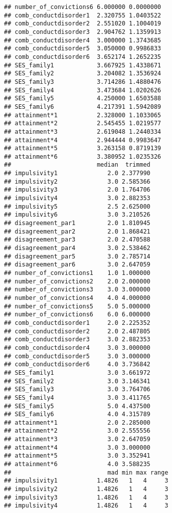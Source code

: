 \documentclass[]{tufte-handout}
\begin{document}
\begin{verbatim}
## number_of_convictions6 6.000000 0.0000000
## comb_conductdisorder1  2.320755 1.0403522
## comb_conductdisorder2  2.551020 1.1004019
## comb_conductdisorder3  2.904762 1.1359913
## comb_conductdisorder4  3.000000 1.3743685
## comb_conductdisorder5  3.050000 0.9986833
## comb_conductdisorder6  3.652174 1.2652235
## SES_family1            3.667925 1.4338671
## SES_family2            3.204082 1.3536924
## SES_family3            3.714286 1.4880476
## SES_family4            3.473684 1.0202626
## SES_family5            4.250000 1.6503588
## SES_family6            4.217391 1.5942089
## attainment*1           2.328000 1.1033065
## attainment*2           2.545455 1.0219577
## attainment*3           2.619048 1.2440334
## attainment*4           2.944444 0.9983647
## attainment*5           3.263158 0.8719139
## attainment*6           3.380952 1.0235326
##                        median  trimmed
## impulsivity1              2.0 2.377990
## impulsivity2              3.0 2.585366
## impulsivity3              2.0 1.764706
## impulsivity4              3.0 2.882353
## impulsivity5              2.5 2.625000
## impulsivity6              3.0 3.210526
## disagreement_par1         2.0 1.810945
## disagreement_par2         2.0 1.868421
## disagreement_par3         2.0 2.470588
## disagreement_par4         3.0 2.538462
## disagreement_par5         3.0 2.785714
## disagreement_par6         3.0 2.647059
## number_of_convictions1    1.0 1.000000
## number_of_convictions2    2.0 2.000000
## number_of_convictions3    3.0 3.000000
## number_of_convictions4    4.0 4.000000
## number_of_convictions5    5.0 5.000000
## number_of_convictions6    6.0 6.000000
## comb_conductdisorder1     2.0 2.225352
## comb_conductdisorder2     2.0 2.487805
## comb_conductdisorder3     3.0 2.882353
## comb_conductdisorder4     3.0 3.000000
## comb_conductdisorder5     3.0 3.000000
## comb_conductdisorder6     4.0 3.736842
## SES_family1               3.0 3.661972
## SES_family2               3.0 3.146341
## SES_family3               3.0 3.764706
## SES_family4               3.0 3.411765
## SES_family5               5.0 4.437500
## SES_family6               4.0 4.315789
## attainment*1              2.0 2.285000
## attainment*2              3.0 2.555556
## attainment*3              3.0 2.647059
## attainment*4              3.0 3.000000
## attainment*5              3.0 3.352941
## attainment*6              4.0 3.588235
##                           mad min max range
## impulsivity1           1.4826   1   4     3
## impulsivity2           1.4826   1   4     3
## impulsivity3           1.4826   1   4     3
## impulsivity4           1.4826   1   4     3

\end{verbatim}
\end{document}
